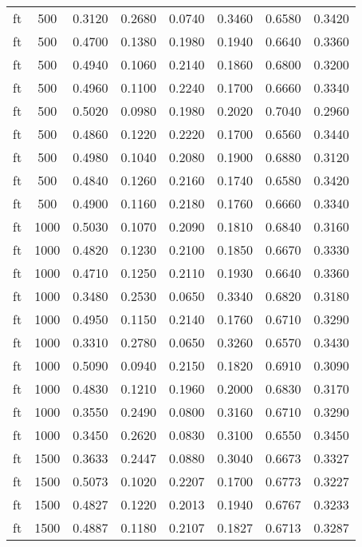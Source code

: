 \begin{table}[h!]
\begin{tabularx}{\textwidth}{cccccccc}
		ft       & 500  & 0.3120 & 0.2680 & 0.0740 & 0.3460 & 0.6580 & 0.3420 \\
		ft       & 500  & 0.4700 & 0.1380 & 0.1980 & 0.1940 & 0.6640 & 0.3360 \\
		ft       & 500  & 0.4940 & 0.1060 & 0.2140 & 0.1860 & 0.6800 & 0.3200 \\
		ft       & 500  & 0.4960 & 0.1100 & 0.2240 & 0.1700 & 0.6660 & 0.3340 \\
		ft       & 500  & 0.5020 & 0.0980 & 0.1980 & 0.2020 & 0.7040 & 0.2960 \\
		ft       & 500  & 0.4860 & 0.1220 & 0.2220 & 0.1700 & 0.6560 & 0.3440 \\
		ft       & 500  & 0.4980 & 0.1040 & 0.2080 & 0.1900 & 0.6880 & 0.3120 \\
		ft       & 500  & 0.4840 & 0.1260 & 0.2160 & 0.1740 & 0.6580 & 0.3420 \\
		ft       & 500  & 0.4900 & 0.1160 & 0.2180 & 0.1760 & 0.6660 & 0.3340 \\
		ft       & 1000 & 0.5030 & 0.1070 & 0.2090 & 0.1810 & 0.6840 & 0.3160 \\
		ft       & 1000 & 0.4820 & 0.1230 & 0.2100 & 0.1850 & 0.6670 & 0.3330 \\
		ft       & 1000 & 0.4710 & 0.1250 & 0.2110 & 0.1930 & 0.6640 & 0.3360 \\
		ft       & 1000 & 0.3480 & 0.2530 & 0.0650 & 0.3340 & 0.6820 & 0.3180 \\
		ft       & 1000 & 0.4950 & 0.1150 & 0.2140 & 0.1760 & 0.6710 & 0.3290 \\
		ft       & 1000 & 0.3310 & 0.2780 & 0.0650 & 0.3260 & 0.6570 & 0.3430 \\
		ft       & 1000 & 0.5090 & 0.0940 & 0.2150 & 0.1820 & 0.6910 & 0.3090 \\
		ft       & 1000 & 0.4830 & 0.1210 & 0.1960 & 0.2000 & 0.6830 & 0.3170 \\
		ft       & 1000 & 0.3550 & 0.2490 & 0.0800 & 0.3160 & 0.6710 & 0.3290 \\
		ft       & 1000 & 0.3450 & 0.2620 & 0.0830 & 0.3100 & 0.6550 & 0.3450 \\
		ft       & 1500 & 0.3633 & 0.2447 & 0.0880 & 0.3040 & 0.6673 & 0.3327 \\
		ft       & 1500 & 0.5073 & 0.1020 & 0.2207 & 0.1700 & 0.6773 & 0.3227 \\
		ft       & 1500 & 0.4827 & 0.1220 & 0.2013 & 0.1940 & 0.6767 & 0.3233 \\
		ft       & 1500 & 0.4887 & 0.1180 & 0.2107 & 0.1827 & 0.6713 & 0.3287 \\

\end{tabularx}
\end{table}
